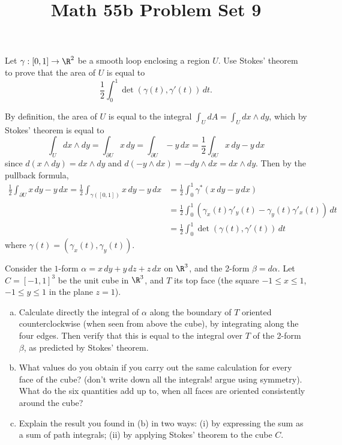 \documentclass[11pt,letterpaper]{article}
\title{\textbf{Math 55b Problem Set 9}}
\begin{document}
\maketitle

\begin{problem}
    Let $\gamma:[0,1]\to \R^2$ be a smooth loop enclosing a region $U$. Use Stokes' theorem to prove that the area of $U$ is equal to \[\frac12 \int_0^1 \det(\gamma(t),\gamma'(t))\,dt.\] 
\end{problem}

\begin{solution}
    By definition, the area of $U$ is equal to the integral $\int_U dA=\int_U dx\wedge dy$, which by Stokes' theorem is equal to
    \[
        \int_U dx\wedge dy = \int_{\partial U} x\,dy=\int_{\partial U} -y\,dx = \frac{1}{2}\int_{\partial U}x\,dy-y\,dx
    \]  
    since $d(x\wedge dy)=dx\wedge dy$ and $d(-y\wedge dx) = -dy\wedge dx = dx\wedge dy$. Then by the pullback formula,
    \[
        \begin{aligned}
            \frac{1}{2}\int_{\partial U} x\,dy - y\,dx = \frac{1}{2}\int_{\gamma([0,1])} x\,dy-y\,dx &= \frac{1}{2}\int^1_0 \gamma^*(x\,dy-y\,dx)\\
            &= \frac{1}{2}\int^1_0(\gamma_x(t)\gamma'_y(t)-\gamma_y(t)\gamma'_x(t))\,dt\\
            &= \frac{1}{2}\int^1_0\det(\gamma(t), \gamma'(t))\,dt
        \end{aligned}
    \]
    where $\gamma(t)=(\gamma_x(t),\gamma_y(t))$.    
\end{solution}

\begin{problem}
    Consider the $1$-form $\alpha=x\,dy+y\,dz+z\,dx$ on $\R^3$, and the 2-form $\beta=d\alpha$. Let $C=[-1,1]^3$ be the unit cube in $\R^3$, and $T$ its top face (the square $-1\leq x\leq 1$, $-1\leq y\leq 1$ in the plane $z=1$).

    \begin{enumerate}[(a)]
        \item Calculate directly the integral of $\alpha$ along the boundary of $T$ oriented counterclockwise (when seen from above the cube), by integrating along the four edges. Then verify that this is equal to the integral over $T$ of the 2-form $\beta$, as predicted by Stokes' theorem.
        \item What values do you obtain if you carry out the same calculation for every face of the cube? (don't write down all the integrals! argue using symmetry). What do the six quantities add up to, when all faces are oriented consistently around the cube?
        \item Explain the result you found in (b) in two ways: (i) by expressing the sum as a sum of path integrals; (ii) by applying Stokes' theorem to the cube $C$. 
    \end{enumerate}
\end{problem}
\end{document}
